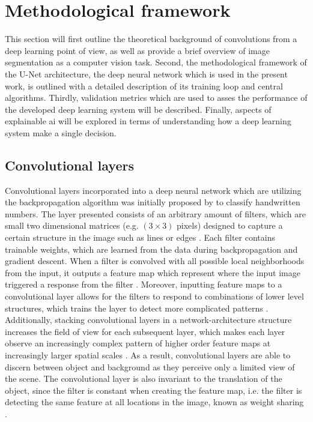 \documentclass[../main/thesis.tex]{subfiles}
\begin{document}
\section{Methodological framework}
This section will first outline the theoretical background of convolutions from a deep learning point of view, as well as provide a brief overview of image segmentation as a computer vision task. Second, the methodological framework of the U-Net architecture, the deep neural network which is used in the present work, is outlined with a detailed description of its training loop and central algorithms. Thirdly, validation metrics which are used to asses the performance of the developed deep learning system will be described. Finally, aspects of explainable ai will be explored in terms of understanding how a deep learning system make a single decision. 

\subsection{Convolutional layers}
\label{sec:convolutional-layer}
Convolutional layers incorporated into a deep neural network which are utilizing the backpropagation algorithm \citep{Rumelhart1986} was initially proposed by \citet{LeCun1989} to classify handwritten numbers. The layer \citet{LeCun1989} presented consists of an arbitrary amount of filters, which are small two dimensional matrices (e.g. $(3 \times 3)$ pixels) designed to capture a certain structure in the image such as lines or edges . Each filter contains trainable weights, which are learned from the data during backpropagation \citep{LeCun1989} and gradient descent. When a filter is convolved with all possible local neighborhoods from the input, it outputs a feature map which represent where the input image triggered a response from the filter \citep{Zeiler2010}. Moreover, inputting feature maps to a convolutional layer allows for the filters to respond to combinations of lower level structures, which trains the layer to detect more complicated patterns \citep{Fukushima1980}. Additionally, stacking convolutional layers in a network-architecture structure increases the field of view for each subsequent layer, which makes each layer observe an increasingly complex pattern of higher order feature maps at increasingly larger spatial scales \citep{Fukushima1980}. As a result, convolutional layers are able to discern between object and background as they perceive only a limited view of the scene. The convolutional layer is also invariant to the translation of the object, since the filter is constant when creating the feature map, i.e. the filter is detecting the same feature at all locations in the image, known as weight sharing \citep{LeCun1989}.
\end{document}
